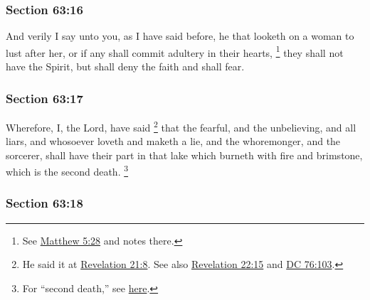 	\subsubsection{Section 63:16} %
		\label{DC63-16}

		And verily I say unto you, as I have said before, he that looketh on a woman to lust after her, or if any shall commit adultery in their hearts,%
			\footnote{%
				See \hyperref[MATTHEW-5-28]{Matthew 5:28} and notes there.
				}
		they shall not have the Spirit, but shall deny the faith and shall fear.


	\subsubsection{Section 63:17} %
		\label{DC63-17}

		Wherefore, I, the Lord, have said%
			\footnote{%
				He said it at \hyperref[REVELATIONNT-21-8]{Revelation 21:8}. See also \hyperref[REVELATIONNT-22-15]{Revelation 22:15} and \hyperref[DC76-103]{DC 76:103}.
				}
		that the fearful, and the unbelieving, and all liars, and whosoever loveth and maketh a lie, and the whoremonger, and the sorcerer, shall have their part in that lake which burneth with fire and brimstone, which is the second death.%
			\footnote{%
				For ``second death,'' see \hyperref[DEATH-PHRASES]{here}.
				}


	\subsubsection{Section 63:18} %
		\label{DC63-18}

